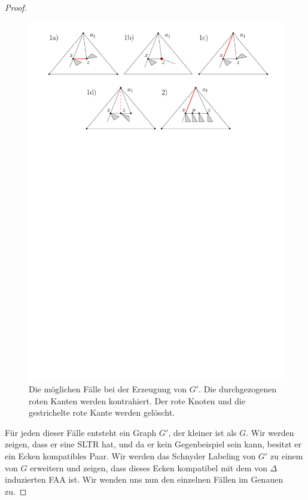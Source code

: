 \begin{proof}
\begin{figure}
	\centering
	  \includegraphics[width=1\textwidth]{lem5_2.pdf}
    	\caption{Die möglichen Fälle bei der Erzeugung von $G'$. Die durchgezogenen roten Kanten werden kontrahiert. Der rote Knoten und die gestrichelte rote Kante werden gelöscht.}
    	\label{pic_lem5_2}
\end{figure}

Für jeden dieser Fälle entsteht ein Graph $G'$, der kleiner ist als $G$. Wir werden zeigen, dass er eine SLTR hat, und da er kein Gegenbeispiel sein kann, besitzt er ein Ecken kompatibles Paar. Wir werden das Schnyder Labeling von $G'$ zu einem von $G$ erweitern und zeigen, dass dieses Ecken kompatibel mit dem von $\Delta$ induzierten FAA ist. Wir wenden uns nun den einzelnen Fällen im Genauen zu. 


\end{proof}
